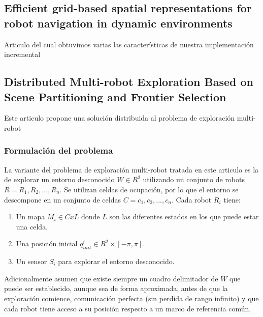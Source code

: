 \subsection{Efficient grid-based spatial representations for robot navigation in dynamic environments}
Articulo del cual obtuvimos varias las características de nuestra implementación incremental



\subsection[Distributed Multi-robot Exploration Based on Scene Partitioning and Frontier Selection]{Distributed Multi-robot Exploration Based on\\ Scene Partitioning and Frontier Selection}

Este articulo propone una solución distribuida al problema de exploración multi-robot%

\subsubsection{Formulación del problema}
La variante del problema de exploración multi-robot tratada en este articulo es la de explorar un entorno desconocido $W\in R^2$ utilizando un conjunto de robots $R={R_1,R_2,...,R_n}$. Se utilizan celdas de ocupación, por lo que el entorno se descompone en un conjunto de celdas $C={c_1,c_2,...,c_n}$. Cada robot $R_i$ tiene:
\begin{enumerate}
  \item Un mapa $M_i \in CxL$ donde $L$ son las diferentes estados en los que puede estar una celda. 
  \item Una posición inicial $q_{init}^{i}\in R^2 \times [-\pi,\pi]$. 
  \item Un sensor $S_i$ para explorar el entorno desconocido.
\end{enumerate}

Adicionalmente asumen que existe siempre un cuadro delimitador de $W$ que puede ser establecido, aunque sea de forma aproximada, antes de que la exploración comience, comunicación perfecta (sin perdida de rango infinito) y que cada robot tiene acceso a su posición respecto a un marco de referencia común.

